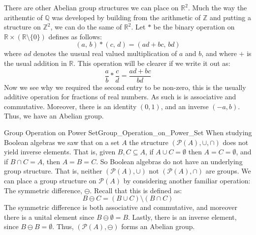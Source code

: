     \begin{example}
        There are other Abelian group structures we can place on
        $\mathbb{R}^{2}$. Much the way the arithemtic of $\mathbb{Q}$ was
        developed by building from the arithmetic of $\mathbb{Z}$ and putting
        a structure on $\mathbb{Z}^{2}$, we can do the same of $\mathbb{R}^{2}$.
        Let $*$ be the binary operation on
        $\mathbb{R}\times(\mathbb{R}\setminus\{0\})$ defines as follows:
        \begin{equation}
            (a,\,b)*(c,\,d)=(ad+bc,\,bd)
        \end{equation}
        where $ad$ denotes the uusual real valued multiplication of $a$ and $b$,
        and where $+$ is the usual addition in $\mathbb{R}$. This operation
        will be clearer if we write it out as:
        \begin{equation}
            \frac{a}{b}*\frac{c}{d}
            =\frac{ad+bc}{bd}
        \end{equation}
        Now we see why we required the second entry to be non-zero, this is the
        usually additive operation for fractions of real numbers. As such is is
        associative and commutative. Moreover, there is an identity $(0,1)$, and
        an inverse $(\minus{a},b)$. Thus, we have an Abelian group.
    \end{example}
    \begin{lexample}{Group Operation on Power Set}{Group_Operation_on_Power_Set}
        When studying Boolean algebras we saw that on a set $A$ the
        structure $(\mathcal{P}(A),\cup,\cap)$ does not yield inverse elements.
        That is, given $B,C\subseteq{A}$, if $A\cup{C}=\emptyset$ then
        $A=C=\emptyset$, and if $B\cap{C}=A$, then $A=B=C$. So Boolean algebras
        do not have an underlying group structure. That is, neither
        $(\mathcal{P}(A),\cup)$ not $(\mathcal{P}(A),\cap)$ are groups. We can
        place a group structure on $\mathcal{P}(A)$ by considering another
        familiar operation: The symmetric
        difference, $\ominus$. Recall that this is
        defined as:
        \begin{equation}
            B\ominus{C}=(B\cup{C})\setminus(B\cap{C})
        \end{equation}
        The symmetric difference is both associative and commutative, and
        moreover there is a unital element since $B\ominus\emptyset=B$. Lastly,
        there is an inverse element, since $B\ominus{B}=\emptyset$. Thus,
        $(\mathcal{P}(A),\ominus)$ forms an Abelian group.
    \end{lexample}
